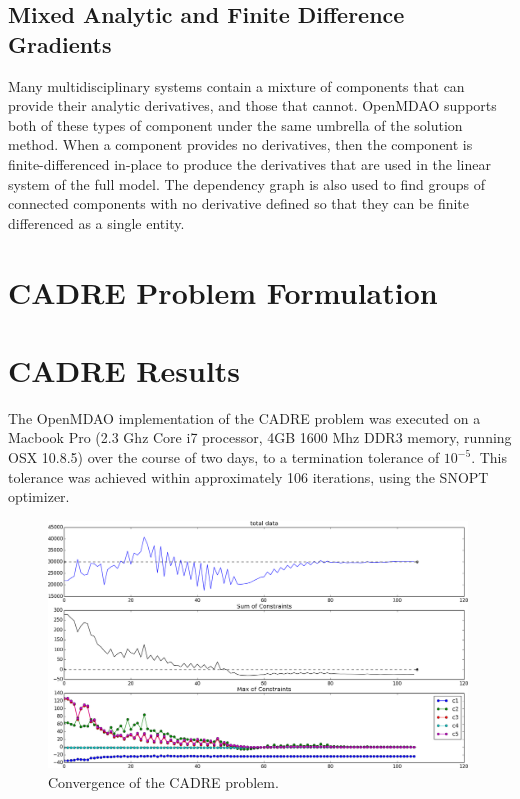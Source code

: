 \documentclass[]{aiaa-tc} %
\begin{document}
    
    \subsection{Mixed Analytic and Finite Difference Gradients}
    
    Many multidisciplinary systems contain a mixture of components that can provide their analytic derivatives, and
    those that cannot. OpenMDAO supports both of these types of component under the same umbrella of the
    solution method. When a component provides no derivatives, then the component is finite-differenced in-place to
    produce the derivatives that are used in the linear system of the full model. The dependency graph is also used
    to find groups of connected components with no derivative defined so that they can be finite differenced as a single entity. 
    
  \section{CADRE Problem Formulation}

  \section{CADRE Results}

The OpenMDAO implementation of the CADRE problem was executed on a Macbook Pro (2.3 Ghz Core i7 processor, 4GB 1600 Mhz DDR3 memory, running OSX 10.8.5)
over the course of two days, to a termination tolerance of $10^{-5}$. This tolerance
was achieved within approximately 106 iterations, using the SNOPT\cite{gill2005snopt}
optimizer.

\begin{figure}
\centering
\includegraphics[width=0.99\textwidth]{images/opt.png}
\caption[width=0.22\textwidth]{Convergence of the CADRE problem.}
\label{convergence}
\end{figure}
\end{document}
